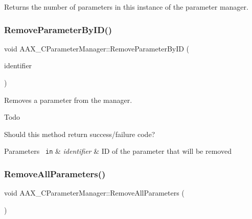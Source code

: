 Returns the number of parameters in this instance of the parameter manager. 

\mbox{\label{a01545_a1c37068e235b493a6aa2a57fa26379ba}} 
\subsubsection{\texorpdfstring{RemoveParameterByID()}{RemoveParameterByID()}}
{\footnotesize\ttfamily void A\+A\+X\+\_\+\+C\+Parameter\+Manager\+::\+Remove\+Parameter\+By\+ID (\begin{DoxyParamCaption}\item[{\mbox{\hyperlink{a00392_a1440c756fe5cb158b78193b2fc1780d1}{A\+A\+X\+\_\+\+C\+Param\+ID}}}]{identifier }\end{DoxyParamCaption})}



Removes a parameter from the manager. 

\begin{DoxyRefDesc}{Todo}
\item[\mbox{\hyperlink{a00785__todo000019}{Todo}}]Should this method return success/failure code?\end{DoxyRefDesc}



\begin{DoxyParams}[1]{Parameters}
\mbox{\texttt{ in}}  & {\em identifier} & ID of the parameter that will be removed \\
\hline
\end{DoxyParams}
\mbox{\label{a01545_a6bbfed26d6dda840c89df90b66c196ac}} 
\subsubsection{\texorpdfstring{RemoveAllParameters()}{RemoveAllParameters()}}
{\footnotesize\ttfamily void A\+A\+X\+\_\+\+C\+Parameter\+Manager\+::\+Remove\+All\+Parameters (\begin{DoxyParamCaption}{ }\end{DoxyParamCaption})}



